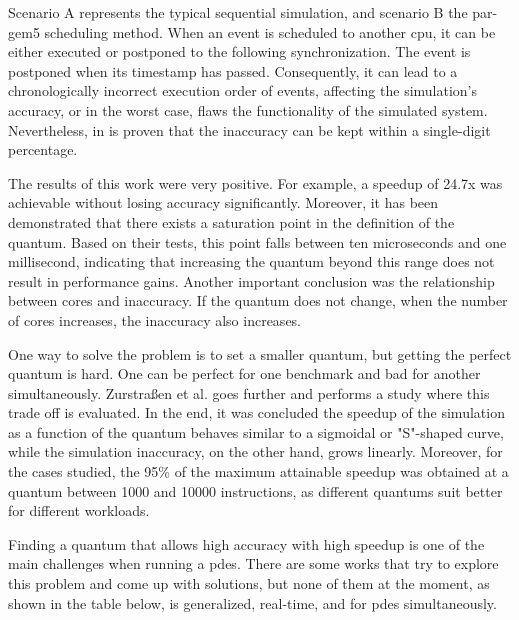 Scenario A represents the typical sequential simulation, and scenario B the par-gem5 scheduling method. When an event is scheduled to another \gls{cpu}, it can be either executed or postponed to the following synchronization. The event is postponed when its timestamp has passed. Consequently, it can lead to a chronologically incorrect execution order of events, affecting the simulation’s accuracy, or in the worst case, flaws the functionality of the simulated system. Nevertheless, in \cite{pargem5} is proven that the inaccuracy can be kept within a single-digit percentage.

The results of this work were very positive. For example, a speedup of 24.7x was achievable without losing accuracy significantly. Moreover, it has been demonstrated that there exists a saturation point in the definition of the quantum. Based on their tests, this point falls between ten microseconds and one millisecond, indicating that increasing the quantum beyond this range does not result in performance gains. Another important conclusion was the relationship between cores and inaccuracy. If the quantum does not change, when the number of cores increases, the inaccuracy also increases. 

One way to solve the problem is to set a smaller quantum, but getting the perfect quantum is hard. One can be perfect for one benchmark and bad for another simultaneously. Zurstraßen et al. \cite{BeyondQuantumTDSim} goes further and performs a study where this trade off is evaluated. In the end, it was concluded the speedup of the simulation as a function of the quantum behaves similar to a sigmoidal or "S"-shaped curve, while the simulation inaccuracy, on the other hand, grows linearly. Moreover, for the cases studied, the 95\% of the maximum attainable speedup was obtained at a quantum between 1000 and 10000 instructions, as different quantums suit better for different workloads.

Finding a quantum that allows high accuracy with high speedup is one of the main challenges when running a \gls{pdes}. There are some works that try to explore this problem and come up with solutions, but none of them at the moment, as shown in the table below, is generalized, real-time, and for \gls{pdes} simultaneously. 

